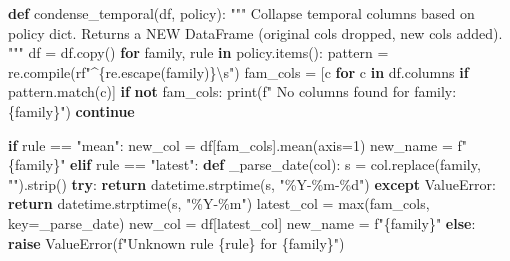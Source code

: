 \documentclass[
  letterpaper,
  DIV=11,
  numbers=noendperiod]{scrreprt}
\newenvironment{Shaded}{\begin{snugshade}}{\end{snugshade}}
\newcommand{\BuiltInTok}[1]{\textcolor[rgb]{0.00,0.23,0.31}{#1}}
\newcommand{\CommentTok}[1]{\textcolor[rgb]{0.37,0.37,0.37}{#1}}
\newcommand{\ControlFlowTok}[1]{\textcolor[rgb]{0.00,0.23,0.31}{\textbf{#1}}}
\newcommand{\DecValTok}[1]{\textcolor[rgb]{0.68,0.00,0.00}{#1}}
\newcommand{\KeywordTok}[1]{\textcolor[rgb]{0.00,0.23,0.31}{\textbf{#1}}}
\newcommand{\NormalTok}[1]{\textcolor[rgb]{0.00,0.23,0.31}{#1}}
\newcommand{\OperatorTok}[1]{\textcolor[rgb]{0.37,0.37,0.37}{#1}}
\newcommand{\PreprocessorTok}[1]{\textcolor[rgb]{0.68,0.00,0.00}{#1}}
\newcommand{\SpecialCharTok}[1]{\textcolor[rgb]{0.37,0.37,0.37}{#1}}
\newcommand{\SpecialStringTok}[1]{\textcolor[rgb]{0.13,0.47,0.30}{#1}}
\newcommand{\StringTok}[1]{\textcolor[rgb]{0.13,0.47,0.30}{#1}}
\newcommand{\VerbatimStringTok}[1]{\textcolor[rgb]{0.13,0.47,0.30}{#1}}
\begin{document}
\begin{Shaded}
\begin{Highlighting}[]
\KeywordTok{def}\NormalTok{ condense\_temporal(df, policy):}
    \CommentTok{"""}
\CommentTok{    Collapse temporal columns based on \textasciigrave{}policy\textasciigrave{} dict.}
\CommentTok{    Returns a NEW DataFrame (original cols dropped, new cols added).}
\CommentTok{    """}
\NormalTok{    df }\OperatorTok{=}\NormalTok{ df.copy()}
    \ControlFlowTok{for}\NormalTok{ family, rule }\KeywordTok{in}\NormalTok{ policy.items():}
\NormalTok{        pattern }\OperatorTok{=}\NormalTok{ re.}\BuiltInTok{compile}\NormalTok{(}\VerbatimStringTok{rf"}\DecValTok{\^{}}\SpecialCharTok{\{}\NormalTok{re}\SpecialCharTok{.}\NormalTok{escape(family)}\SpecialCharTok{\}}\DecValTok{\textbackslash{}s}\VerbatimStringTok{"}\NormalTok{)}
\NormalTok{        fam\_cols }\OperatorTok{=}\NormalTok{ [c }\ControlFlowTok{for}\NormalTok{ c }\KeywordTok{in}\NormalTok{ df.columns }\ControlFlowTok{if}\NormalTok{ pattern.match(c)]}
        \ControlFlowTok{if} \KeywordTok{not}\NormalTok{ fam\_cols:}
            \BuiltInTok{print}\NormalTok{(}\SpecialStringTok{f" No columns found for family: }\SpecialCharTok{\{}\NormalTok{family}\SpecialCharTok{\}}\SpecialStringTok{"}\NormalTok{)}
            \ControlFlowTok{continue}

        \ControlFlowTok{if}\NormalTok{ rule }\OperatorTok{==} \StringTok{"mean"}\NormalTok{:}
\NormalTok{            new\_col }\OperatorTok{=}\NormalTok{ df[fam\_cols].mean(axis}\OperatorTok{=}\DecValTok{1}\NormalTok{)}
\NormalTok{            new\_name }\OperatorTok{=} \SpecialStringTok{f"}\SpecialCharTok{\{}\NormalTok{family}\SpecialCharTok{\}}\SpecialStringTok{"}
        \ControlFlowTok{elif}\NormalTok{ rule }\OperatorTok{==} \StringTok{"latest"}\NormalTok{:}
            \KeywordTok{def}\NormalTok{ \_parse\_date(col):}
\NormalTok{                s }\OperatorTok{=}\NormalTok{ col.replace(family, }\StringTok{""}\NormalTok{).strip()}
                \ControlFlowTok{try}\NormalTok{:}
                    \ControlFlowTok{return}\NormalTok{ datetime.strptime(s, }\StringTok{"\%Y{-}\%m{-}}\SpecialCharTok{\%d}\StringTok{"}\NormalTok{)}
                \ControlFlowTok{except} \PreprocessorTok{ValueError}\NormalTok{:}
                    \ControlFlowTok{return}\NormalTok{ datetime.strptime(s, }\StringTok{"\%Y{-}\%m"}\NormalTok{)}
\NormalTok{            latest\_col }\OperatorTok{=} \BuiltInTok{max}\NormalTok{(fam\_cols, key}\OperatorTok{=}\NormalTok{\_parse\_date)}
\NormalTok{            new\_col }\OperatorTok{=}\NormalTok{ df[latest\_col]}
\NormalTok{            new\_name }\OperatorTok{=} \SpecialStringTok{f"}\SpecialCharTok{\{}\NormalTok{family}\SpecialCharTok{\}}\SpecialStringTok{"}
        \ControlFlowTok{else}\NormalTok{:}
            \ControlFlowTok{raise} \PreprocessorTok{ValueError}\NormalTok{(}\SpecialStringTok{f"Unknown rule \textquotesingle{}}\SpecialCharTok{\{}\NormalTok{rule}\SpecialCharTok{\}}\SpecialStringTok{\textquotesingle{} for }\SpecialCharTok{\{}\NormalTok{family}\SpecialCharTok{\}}\SpecialStringTok{"}\NormalTok{)}


\end{Highlighting}
\end{Shaded}
\end{document}
